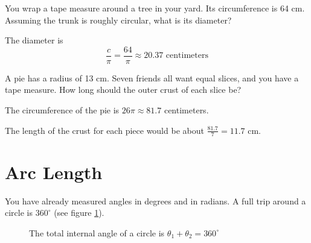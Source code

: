 \begin{Exercise}[title={Circumference}, label=circumference]

  You wrap a tape measure around a tree in your yard. Its circumference is
  64 cm. Assuming the trunk is roughly circular, what is its diameter?
  
\end{Exercise}
\begin{Answer}[ref=circumference]

  The diameter is $$\frac{c}{\pi} = \frac{64}{\pi} \approx 20.37 \text{ 
  centimeters}$$
  
\end{Answer}
\begin{Exercise}[title={Splitting a Pie}, label=pie_splitting]

  A pie has a radius of 13 cm. Seven friends all want equal slices, and
  you have a tape measure. How long should the outer crust of each slice be?

\end{Exercise}
\begin{Answer}[ref=pie_splitting]

  The circumference of the pie is $26 \pi \approx 81.7$ centimeters.
  
  The length of the crust for each piece would be about $\frac{81.7}{7} = 11.7$
  cm.

  
\end{Answer}

\section{Arc Length}
You have already measured angles in degrees and in radians. A full trip
around a circle is $360^\circ$ (see figure \ref{fig:circledeg}). 

\begin{figure}[H]
\centering
{}
    \caption{The total internal angle of a circle is $\theta_1 + \theta_2 = 
    360^\circ$}
    \label{fig:circledeg}
\end{figure}

